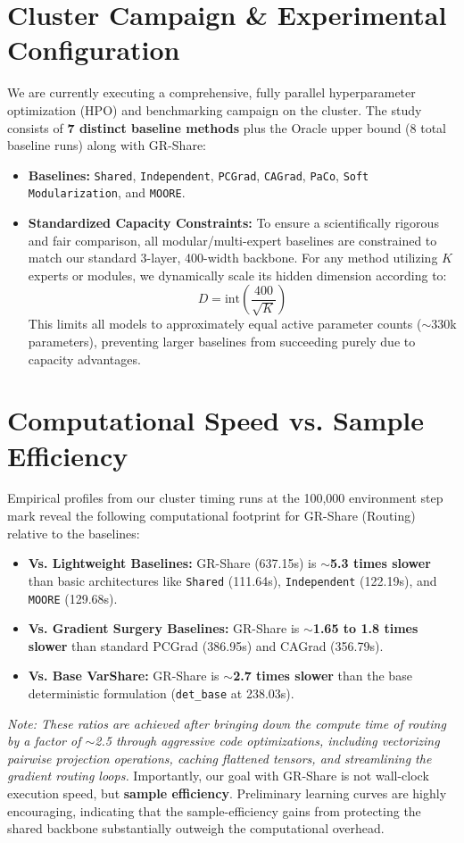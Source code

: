 \documentclass[11pt,a4paper]{article}
\begin{document}
\section{Cluster Campaign & Experimental Configuration}
We are currently executing a comprehensive, fully parallel hyperparameter optimization (HPO) and benchmarking campaign on the cluster. The study consists of \textbf{7 distinct baseline methods} plus the Oracle upper bound (8 total baseline runs) along with GR-Share:
\begin{itemize}
    \item \textbf{Baselines:} \texttt{Shared}, \texttt{Independent}, \texttt{PCGrad}, \texttt{CAGrad}, \texttt{PaCo}, \texttt{Soft Modularization}, and \texttt{MOORE}.
    \item \textbf{Standardized Capacity Constraints:} To ensure a scientifically rigorous and fair comparison, all modular/multi-expert baselines are constrained to match our standard 3-layer, 400-width backbone. For any method utilizing $K$ experts or modules, we dynamically scale its hidden dimension according to:
    \begin{equation}
        D = \text{int}\left(\frac{400}{\sqrt{K}}\right)
    \end{equation}
    This limits all models to approximately equal active parameter counts ($\sim$330k parameters), preventing larger baselines from succeeding purely due to capacity advantages.
\end{itemize}
\section{Computational Speed vs. Sample Efficiency}
Empirical profiles from our cluster timing runs at the 100,000 environment step mark reveal the following computational footprint for GR-Share (Routing) relative to the baselines:
\begin{itemize}
    \item \textbf{Vs. Lightweight Baselines:} GR-Share (637.15s) is \textbf{$\sim$5.3 times slower} than basic architectures like \texttt{Shared} (111.64s), \texttt{Independent} (122.19s), and \texttt{MOORE} (129.68s).
    \item \textbf{Vs. Gradient Surgery Baselines:} GR-Share is \textbf{$\sim$1.65 to 1.8 times slower} than standard PCGrad (386.95s) and CAGrad (356.79s).
    \item \textbf{Vs. Base VarShare:} GR-Share is \textbf{$\sim$2.7 times slower} than the base deterministic formulation (\texttt{det\_base} at 238.03s).
\end{itemize}
\textit{Note: These ratios are achieved after bringing down the compute time of routing by a factor of $\sim$2.5 through aggressive code optimizations, including vectorizing pairwise projection operations, caching flattened tensors, and streamlining the gradient routing loops.}
Importantly, our goal with GR-Share is not wall-clock execution speed, but \textbf{sample efficiency}. Preliminary learning curves are highly encouraging, indicating that the sample-efficiency gains from protecting the shared backbone substantially outweigh the computational overhead.
\end{document}
